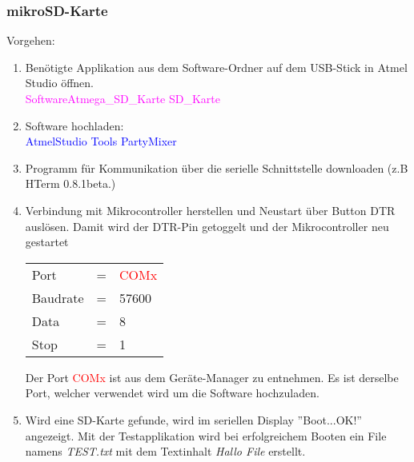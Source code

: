 \subsubsection{mikroSD-Karte}
\label{subsubsec:Inbetriebnahme_mikroSD_Karte}

Vorgehen:
\begin{enumerate}
\item Benötigte Applikation aus dem Software-Ordner auf dem USB-Stick in Atmel Studio öffnen.\\
\textcolor{magenta}{Software\textrightarrow Atmega\_SD\_Karte \textrightarrow SD\_Karte}\\

\item Software hochladen:\\
\textcolor{blue}{AtmelStudio \textrightarrow Tools \textrightarrow PartyMixer}\\

\item Programm für Kommunikation über die serielle Schnittstelle downloaden (z.B HTerm 0.8.1beta.)\cite{hammer_hterm_nodate}\\
\item Verbindung mit Mikrocontroller herstellen und Neustart über Button DTR auslösen. Damit wird der DTR-Pin getoggelt und der Mikrocontroller neu gestartet\\

\begin{table}[h!]
\center
\begin{tabular}{lcl}
Port & = & \textcolor{red}{COMx} \\
Baudrate & = & 57600 \\
Data & = & 8 \\
Stop & = & 1 \\
\end{tabular}
\end{table}

Der Port \textcolor{red}{COMx} ist aus dem Geräte-Manager zu entnehmen. Es ist derselbe Port, welcher verwendet wird um die Software hochzuladen.\\

\item Wird eine SD-Karte gefunde, wird im seriellen Display ''Boot...OK!'' angezeigt. Mit der Testapplikation wird bei erfolgreichem Booten ein File namens \textit{TEST.txt} mit dem Textinhalt \textit{Hallo File} erstellt.

\end{enumerate}
